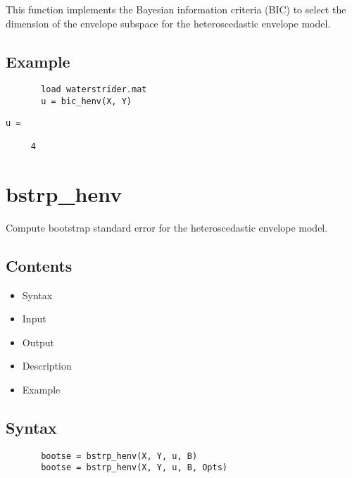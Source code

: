 \documentclass[a4paper,11pt,openany]{memoir}
\begin{document}
\begin{par}
This function implements the Bayesian information criteria (BIC) to select the dimension of the envelope subspace for the heteroscedastic envelope model.
\end{par} \vspace{1em}


\subsection*{Example}


\begin{verbatim}       load waterstrider.mat
       u = bic_henv(X, Y)\end{verbatim}
    
        \color{lightgray}\ttfamily \begin{verbatim}
u =

     4

\end{verbatim} \rmfamily
\color{black}

\newpage

\rmfamily
\color{black}\section{bstrp\_henv}

\begin{par}
Compute bootstrap standard error for the heteroscedastic envelope model.
\end{par} \vspace{1em}

\subsection*{Contents}

\begin{itemize}
\setlength{\itemsep}{-1ex}
   \item Syntax
   \item Input
   \item Output
   \item Description
   \item Example
\end{itemize}


\subsection*{Syntax}


\begin{verbatim}       bootse = bstrp_henv(X, Y, u, B)
       bootse = bstrp_henv(X, Y, u, B, Opts)\end{verbatim}
    
\end{document}

